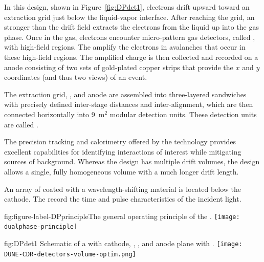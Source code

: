 In this design, shown in Figure~\ref{fig:DPdet1}, electrons drift upward toward an extraction grid just below the liquid-vapor interface. 
After reaching the grid, an \efield stronger than the \dpnominaldriftfield{} drift field extracts the electrons from the liquid up into the gas phase. Once in the gas, electrons encounter micro-pattern gas detectors, called , with high-field regions. The  amplify the electrons in avalanches that occur in these high-field regions. The amplified charge is then collected and recorded on a \twod anode
consisting of two sets of %
gold-plated copper strips that provide the $x$ and $y$ coordinates (and thus two views) of an event. 

 The extraction grid, , and anode are assembled into three-layered sandwiches with precisely defined inter-stage distances and inter-alignment,  which are then connected horizontally into \num{9}~m$^2$ modular detection units. These detection units are called .

The precision tracking and calorimetry offered by the  technology provides excellent capabilities for identifying interactions of interest while mitigating sources of background.  Whereas the  design has multiple drift volumes, the  design allows a single, fully homogeneous  volume with a much longer drift length.

An array of  coated with a wavelength-shifting material is located below the cathode. The  record  the time and pulse characteristics of the incident light.


\begin{dunefigure}{fig:figure-label-DPprinciple}{The general operating principle of the  .}
\texttt{[image: dualphase-principle]}
\end{dunefigure}

\begin{dunefigure}{fig:DPdet1}
  {Schematic of a \nominalmodsize {}    with cathode, , , and anode plane with .}
  \texttt{[image: DUNE-CDR-detectors-volume-optim.png]}
\end{dunefigure}
\FloatBarrier

